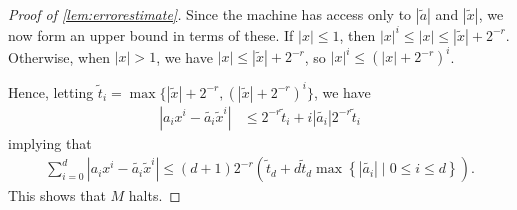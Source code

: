 \documentclass[a4paper,UKenglish,cleveref,autoref,thm-restate]{lipics-v2021}
\begin{document}
\begin{proof}[Proof of \cref{lem:errorestimate}]
	Since the machine has access only to $|\tilde{a}|$ and $|\tilde{x}|$,
	we now form an upper bound in terms of these. If $|x|\le 1$, then
	$|x|^i \le |x| \le |\tilde{x}|+2^{-r}$. Otherwise, when $|x|>1$, we
	have $|x|\le |\tilde{x}|+2^{-r}$, so $|x|^i \le (|x|+2^{-r})^i$.
	
	Hence, letting $\tilde{t}_i =
	\max\{|\tilde{x}|+2^{-r},(|\tilde{x}|+2^{-r})^i\}$, we have
	\begin{align*}
		|a_ix^i-\tilde{a_i}\tilde{x}^i|
		&\le
		2^{-r}\tilde{t}_i +
		i|\tilde{a_i}|2^{-r}\tilde{t}_i
	\end{align*}
	implying that
	\begin{align*}
		\sum_{i=0}^d |a_ix^i-\tilde{a_i}\tilde{x}^i|
		\le
		(d+1)2^{-r} \left(\tilde{t}_d +
		d\tilde{t}_d\max\left\{|\tilde{a_i}|\mid 0\le i \le d\right\} \right).
	\end{align*}
	This shows that $M$ halts.
	

\end{proof}
\end{document}
